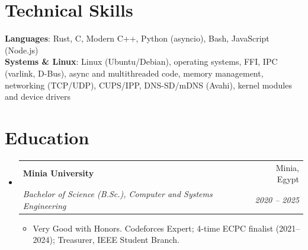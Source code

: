 \documentclass[letterpaper,11pt]{article}
\makeatletter
\newcommand{\resumeItem}[1]{
  \item\small{
    {#1 \vspace{-2pt}}
  }
}
\newcommand{\resumeSubheading}[4]{
  \vspace{-2pt}\item
    \begin{tabular*}{0.97\textwidth}[t]{l@{\extracolsep{\fill}}r}
      \textbf{#1} & #2 \\
      \textit{\small#3} & \textit{\small #4} \\
    \end{tabular*}\vspace{-7pt}
}
\newcommand{\resumeSubHeadingListStart}{\begin{itemize}[leftmargin=0.15in, label={}]}
\newcommand{\resumeSubHeadingListEnd}{\end{itemize}}
\newcommand{\resumeItemListStart}{\begin{itemize}}
\newcommand{\resumeItemListEnd}{\end{itemize}\vspace{-5pt}}
\makeatother
\begin{document}
%
\section{Technical Skills}
 \begin{itemize}[leftmargin=0.15in, label={}]
    \small{\item{
     \textbf{Languages}{: Rust, C, Modern C++, Python (asyncio), Bash, JavaScript (Node.js)} \\
     \textbf{Systems \& Linux}{: Linux (Ubuntu/Debian), operating systems, FFI, IPC (varlink, D-Bus), async and multithreaded code, memory management, networking (TCP/UDP), CUPS/IPP, DNS-SD/mDNS (Avahi), kernel modules and device drivers}
    }}
 \end{itemize}

\section{Education}
  \resumeSubHeadingListStart
    \resumeSubheading
      {Minia University}{Minia, Egypt}
      {Bachelor of Science (B.Sc.), Computer and Systems Engineering}{2020 -- 2025}
      \resumeItemListStart
        \resumeItem{Very Good with Honors. Codeforces Expert; 4-time ECPC finalist (2021--2024); Treasurer, IEEE Student Branch.}
      \resumeItemListEnd
  \resumeSubHeadingListEnd


\end{document}
